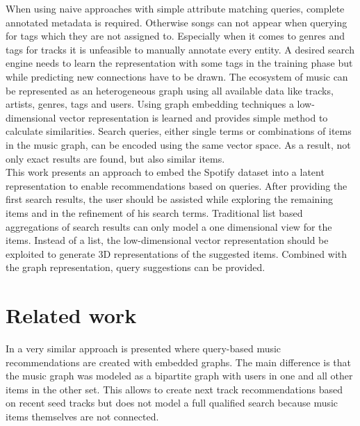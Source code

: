\documentclass[sigconf]{acmart}
\begin{document}
When using naive approaches with simple attribute matching queries, complete annotated metadata is required. Otherwise songs can not appear when querying for tags which they are not assigned to. Especially when it comes to genres and tags for tracks it is unfeasible to manually annotate every entity. A desired search engine needs to learn the representation with some tags in the training phase but while predicting new connections have to be drawn.
The ecosystem of music can be represented as an heterogeneous graph using all available data like tracks, artists, genres, tags and users. Using graph embedding techniques a low-dimensional vector representation is learned and provides simple method to calculate similarities. Search queries, either single terms or combinations of items in the music graph, can be encoded using the same vector space. As a result, not only exact results are found, but also similar items. \\

This work presents an approach to embed the Spotify dataset into a latent representation to enable recommendations based on queries. After providing the first search results, the user should be assisted while exploring the remaining items and in the refinement of his search terms. Traditional list based aggregations of search results can only model a one dimensional view for the items. Instead of a list, the low-dimensional vector representation should be exploited to generate 3D representations of the suggested items. Combined with the graph representation, query suggestions can be provided.



\section{Related work}

In \cite{chen2016query} a very similar approach is presented where query-based music recommendations are created with embedded graphs. The main difference is that the music graph was modeled as a bipartite graph with users in one and all other items in the other set. This allows to create next track recommendations based on recent seed tracks but does not model a full qualified search because music items themselves are not connected. 
\end{document}
